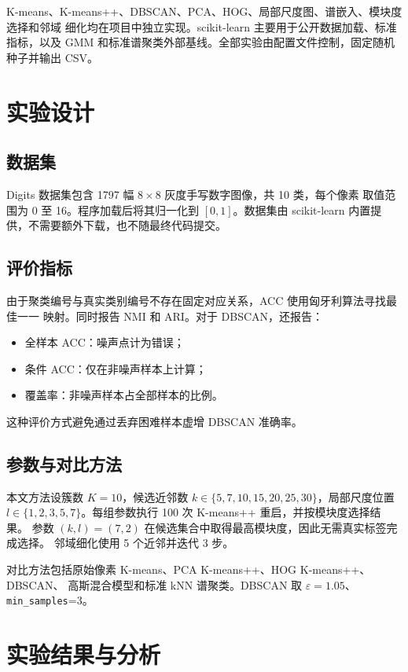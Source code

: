 \documentclass[12pt,a4paper,UTF8]{ctexart}
\begin{document}
K-means、K-means++、DBSCAN、PCA、HOG、局部尺度图、谱嵌入、模块度选择和邻域
细化均在项目中独立实现。scikit-learn 主要用于公开数据加载、标准指标，以及 GMM
和标准谱聚类外部基线。全部实验由配置文件控制，固定随机种子并输出 CSV。

\section{实验设计}

\subsection{数据集}

Digits 数据集包含 1797 幅 $8\times8$ 灰度手写数字图像，共 10 类，每个像素
取值范围为 0 至 16。程序加载后将其归一化到 $[0,1]$。数据集由 scikit-learn
内置提供，不需要额外下载，也不随最终代码提交。

\subsection{评价指标}

由于聚类编号与真实类别编号不存在固定对应关系，ACC 使用匈牙利算法寻找最佳一一
映射\cite{kuhn1955}。同时报告 NMI 和 ARI\cite{hubert1985}。对于 DBSCAN，还报告：

\begin{itemize}
    \item 全样本 ACC：噪声点计为错误；
    \item 条件 ACC：仅在非噪声样本上计算；
    \item 覆盖率：非噪声样本占全部样本的比例。
\end{itemize}

这种评价方式避免通过丢弃困难样本虚增 DBSCAN 准确率。

\subsection{参数与对比方法}

本文方法设簇数 $K=10$，候选近邻数
$k\in\{5,7,10,15,20,25,30\}$，局部尺度位置
$l\in\{1,2,3,5,7\}$。每组参数执行 100 次 K-means++ 重启，并按模块度选择结果。
参数 $(k,l)=(7,2)$ 在候选集合中取得最高模块度，因此无需真实标签完成选择。
邻域细化使用 5 个近邻并迭代 3 步。

对比方法包括原始像素 K-means、PCA K-means++、HOG K-means++、DBSCAN、
高斯混合模型和标准 kNN 谱聚类。DBSCAN 取
$\varepsilon=1.05$、\texttt{min\_samples}=3。

\section{实验结果与分析}
\end{document}
